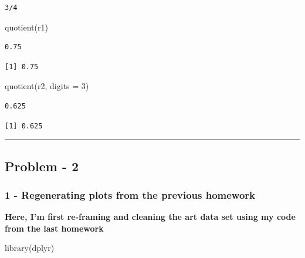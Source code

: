 \documentclass[
  12pt,
]{article}
\newenvironment{Shaded}{\begin{snugshade}}{\end{snugshade}}
\newcommand{\AttributeTok}[1]{\textcolor[rgb]{0.40,0.45,0.13}{#1}}
\newcommand{\DecValTok}[1]{\textcolor[rgb]{0.68,0.00,0.00}{#1}}
\newcommand{\FunctionTok}[1]{\textcolor[rgb]{0.28,0.35,0.67}{#1}}
\newcommand{\NormalTok}[1]{\textcolor[rgb]{0.00,0.23,0.31}{#1}}
\begin{document}
\begin{verbatim}
3/4
\end{verbatim}

\begin{Shaded}
\begin{Highlighting}[]
\FunctionTok{quotient}\NormalTok{(r1)}
\end{Highlighting}
\end{Shaded}

\begin{verbatim}
0.75 
\end{verbatim}

\begin{verbatim}
[1] 0.75
\end{verbatim}

\begin{Shaded}
\begin{Highlighting}[]
\FunctionTok{quotient}\NormalTok{(r2, }\AttributeTok{digits =} \DecValTok{3}\NormalTok{)}
\end{Highlighting}
\end{Shaded}

\begin{verbatim}
0.625 
\end{verbatim}

\begin{verbatim}
[1] 0.625
\end{verbatim}

\begin{center}\rule{0.5\linewidth}{0.5pt}\end{center}

\subsection{Problem - 2}\label{problem---2}

\subsubsection{1 - Regenerating plots from the previous
homework}\label{regenerating-plots-from-the-previous-homework}

\textbf{Here, I'm first re-framing and cleaning the art data set using
my code from the last homework}

\begin{Shaded}
\begin{Highlighting}[]
\FunctionTok{library}\NormalTok{(dplyr)}
\end{Highlighting}
\end{Shaded}
\end{document}
